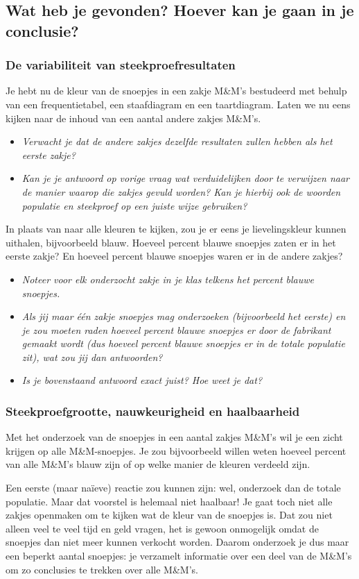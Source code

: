 \documentclass[11pt]{article}
\newcommand{\vraag}[2]{\begin{itemize}\item {\it #1} \vspace*{#2}\end{itemize}}
\begin{document}
\subsection{Wat heb je gevonden? Hoever kan je gaan in je conclusie?}

\subsubsection{De variabiliteit van steekproefresultaten}

Je hebt nu de kleur van de snoepjes in een zakje M\&M’s bestudeerd met behulp van een
frequentietabel, een staafdiagram en een taartdiagram. Laten we nu eens kijken naar de
inhoud van een aantal andere zakjes M\&M's.

\vraag{Verwacht je dat de andere zakjes dezelfde resultaten zullen hebben als het eerste zakje?}{3cm}

\vraag{Kan je je antwoord op vorige vraag wat verduidelijken door te verwijzen naar de manier
waarop die zakjes gevuld worden? Kan je hierbij ook de woorden populatie en steekproef op
een juiste wijze gebruiken?}{3cm}

In plaats van naar alle kleuren te kijken, zou je er eens je lievelingskleur kunnen uithalen,
bijvoorbeeld blauw. Hoeveel percent blauwe snoepjes zaten er in het eerste zakje? En hoeveel percent
blauwe snoepjes waren er in de andere zakjes?

\vraag{Noteer voor elk onderzocht zakje in je klas telkens het percent blauwe snoepjes.}{5cm}

\vraag{Als jij maar één zakje snoepjes mag onderzoeken (bijvoorbeeld het eerste) en je zou moeten raden hoeveel
percent blauwe snoepjes er door de fabrikant gemaakt wordt (dus hoeveel percent blauwe
snoepjes er in de totale populatie zit), wat zou jij dan antwoorden?}{4cm}

\vraag{Is je bovenstaand antwoord exact juist? Hoe weet je dat?}{3cm}

\subsubsection{Steekproefgrootte, nauwkeurigheid en haalbaarheid}

Met het onderzoek van de snoepjes in een aantal zakjes M\&M’s wil je een zicht krijgen op alle
M\&M-snoepjes. Je zou bijvoorbeeld willen weten hoeveel percent van alle M\&M’s blauw zijn of op
welke manier de kleuren verdeeld zijn.

Een eerste (maar naïeve) reactie zou kunnen zijn: wel, onderzoek dan de totale populatie. Maar dat
voorstel is helemaal niet haalbaar! Je gaat toch niet alle zakjes openmaken om te kijken wat de kleur
van de snoepjes is. Dat zou niet alleen veel te veel tijd en geld vragen, het is gewoon onmogelijk
omdat de snoepjes dan niet meer kunnen verkocht worden. Daarom onderzoek je dus maar een
beperkt aantal snoepjes: je verzamelt informatie over een deel van de M\&M’s om zo conclusies te
trekken over alle M\&M’s.
\end{document}
